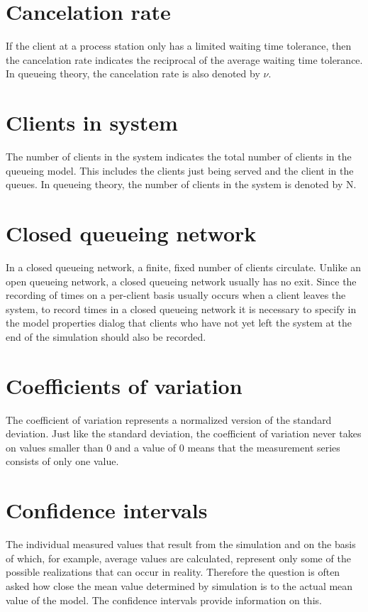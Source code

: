 \section*{Cancelation rate}


If the client at a process station only has a limited waiting time tolerance,
then the cancelation rate indicates the reciprocal of the average waiting time tolerance.
In queueing theory, the cancelation rate is also denoted by $\nu$.

\section*{Clients in system}


The number of clients in the system indicates the total number of clients in the queueing model.
This includes the clients just being served and the client in the queues.
In queueing theory, the number of clients in the system is denoted by N.

\section*{Closed queueing network}


In a closed queueing network, a finite, fixed number of clients circulate. Unlike an open queueing network,
a closed queueing network usually has no exit. Since the recording
of times on a per-client basis usually occurs when a client leaves the system, to record times in a closed
queueing network it is necessary to specify in the model properties dialog
that clients who have not yet left the system at the end of the simulation should also be recorded.

\section*{Coefficients of variation}


The coefficient of variation represents a normalized version of the
standard deviation.
Just like the standard deviation, the coefficient of variation never
takes on values smaller than 0 and a value of 0 means that the
measurement series consists of only one value.

\section*{Confidence intervals}


The individual measured values that result from the simulation and on the basis of which,
for example, average values are calculated, represent
only some of the possible realizations that can occur in reality. Therefore the question is
often asked how close the mean value determined by simulation is to the actual mean value of
the model. The confidence intervals provide information on this.


